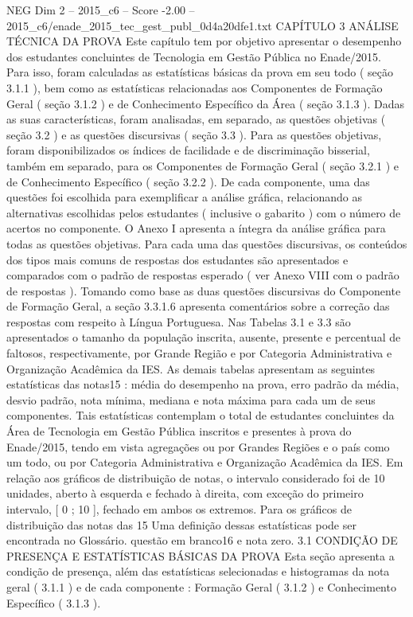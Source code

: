 \begin{textsample}{NEG Dim 2 – 2015\_c6 – Score -2.00 – 2015\_c6/enade\_2015\_tec\_gest\_publ\_0d4a20dfe1.txt}  \label{ex:f2_neg_194}
CAPÍTULO 3 ANÁLISE TÉCNICA DA PROVA Este capítulo tem por objetivo apresentar o desempenho dos estudantes concluintes de Tecnologia em Gestão Pública no Enade/2015.
Para isso, foram calculadas as estatísticas básicas da prova em seu todo ( seção 3.1.1 ), bem como as estatísticas relacionadas aos Componentes de Formação Geral ( seção 3.1.2 ) e de Conhecimento Específico da Área ( seção 3.1.3 ).
Dadas as suas características, foram analisadas, em separado, as questões objetivas ( seção 3.2 ) e as questões discursivas ( seção 3.3 ).
Para as questões objetivas, foram disponibilizados os índices de facilidade e de discriminação bisserial, também em separado, para os Componentes de Formação Geral ( seção 3.2.1 ) e de Conhecimento Específico ( seção 3.2.2 ).
De cada componente, uma das questões foi escolhida para exemplificar a análise gráfica, relacionando as alternativas escolhidas pelos estudantes ( inclusive o gabarito ) com o número de acertos no componente.
O Anexo I apresenta a íntegra da análise gráfica para todas as questões objetivas.
Para cada uma das questões discursivas, os conteúdos dos tipos mais comuns de respostas dos estudantes são apresentados e comparados com o padrão de respostas esperado ( ver Anexo VIII com o padrão de respostas ).
Tomando como base as duas questões discursivas do Componente de Formação Geral, a seção 3.3.1.6 apresenta comentários sobre a correção das respostas com respeito à Língua Portuguesa.
Nas Tabelas 3.1 e 3.3 são apresentados o tamanho da população inscrita, ausente, presente e percentual de faltosos, respectivamente, por Grande Região e por Categoria Administrativa e Organização Acadêmica da IES.
As demais tabelas apresentam as seguintes estatísticas das notas15 : média do desempenho na prova, erro padrão da média, desvio padrão, nota mínima, mediana e nota máxima para cada um de seus componentes.
Tais estatísticas contemplam o total de estudantes concluintes da Área de Tecnologia em Gestão Pública inscritos e presentes à prova do Enade/2015, tendo em vista agregações ou por Grandes Regiões e o país como um todo, ou por Categoria Administrativa e Organização Acadêmica da IES.
Em relação aos gráficos de distribuição de notas, o intervalo considerado foi de 10 unidades, aberto à esquerda e fechado à direita, com exceção do primeiro intervalo, [ 0 ; 10 ], fechado em ambos os extremos.
Para os gráficos de distribuição das notas das 15 Uma definição dessas estatísticas pode ser encontrada no Glossário. questão em branco16 e nota zero. 3.1 CONDIÇÃO DE PRESENÇA E ESTATÍSTICAS BÁSICAS DA PROVA Esta seção apresenta a condição de presença, além das estatísticas selecionadas e histogramas da nota geral ( 3.1.1 ) e de cada componente : Formação Geral ( 3.1.2 ) e Conhecimento Específico ( 3.1.3 ).

\end{textsample}
